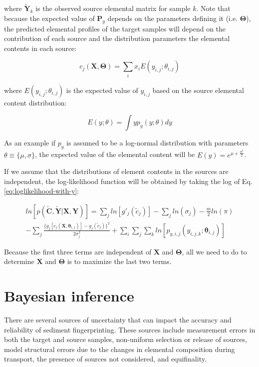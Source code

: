 where $\mathbf{\tilde Y}_k$ is the observed source elemental matrix for sample $k$. Note that because the expected value of $\mathbf{P}_y$ depends on the parameters defining it (i.e. $\bm{\Theta}$), the predicted elemental profiles of the target samples will depend on the contribution of each source and the distribution parameters the elemental contents in each source:

\begin{equation}
    c_j(\mathbf{X},\mathbf{\Theta}) = \sum_i x_i E(y_{i,j};\theta_{i,j})
\end{equation}

where $E(y_{i,j};\theta_{i,j})$ is the expected value of $y_{i,j}$ based on the source elemental content distribution:

\begin{equation}
    E(y;\theta) = \int yp_{y}(y;\theta)dy
\end{equation}

As an example if $p_y$ is assumed to be a log-normal distribution with parameters $\theta \equiv \{\mu, \sigma\}$, the expected value of the elemental content will be $E(y)=e^{\mu+\frac{\sigma^2}{2}}$.

If we assume that the distributions of element contents in the sources are independent, the log-likelihood function will be obtained by taking the log of Eq. \eqref{eq:loglikelihood-with-y}:

\begin{equation}
\begin{split}
    ln[p(\mathbf{\tilde C},\mathbf{\tilde Y}|\mathbf{X},\mathbf{Y})] = \sum_j ln[g'_j(\tilde c_j)] - \sum_j ln(\sigma_j) - \frac{m}{2}ln(\pi) \\ -\sum_j \frac{\{g_j[c_j(\mathbf{X},\bm{\theta}_{i,j})]-g_j(\tilde c_j)\}^2}{{2\sigma_j^2}} + \sum_i\sum_j\sum_k ln[{p}_{y,i,j}(y_{i,j,k};\bm{\theta}_{i,j})]
\end{split}
\end{equation}

Because the first three terms are independent of $\mathbf{X}$ and $\mathbf{\Theta}$, all we need to do to determine $\mathbf{X}$ and $\mathbf{\Theta}$ is to maximize the last two terms. 

\section{Bayesian inference}\label{sec:basic_concepts_bayesian}
There are several sources of uncertainty that can impact the accuracy and reliability of sediment fingerprinting. These sources include measurement errors in both the target and source samples, non-uniform selection or release of sources, model structural errors due to the changes in elemental composition during transport, the presence of sources not considered, and equifinality.

